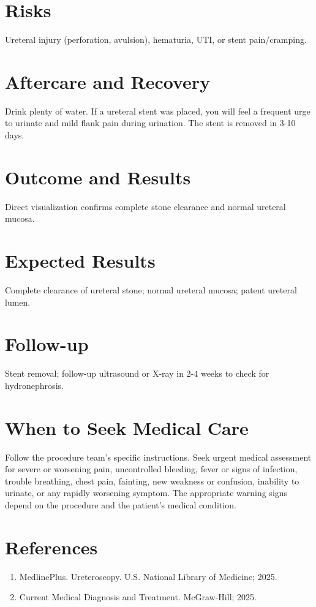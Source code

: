 \section*{Risks}
Ureteral injury (perforation, avulsion), hematuria, UTI, or stent pain/cramping.

\section*{Aftercare and Recovery}
Drink plenty of water. If a ureteral stent was placed, you will feel a frequent urge to urinate and mild flank pain during urination. The stent is removed in 3-10 days.

\section*{Outcome and Results}
Direct visualization confirms complete stone clearance and normal ureteral mucosa.

\section*{Expected Results}
Complete clearance of ureteral stone; normal ureteral mucosa; patent ureteral lumen.

\section*{Follow-up}
Stent removal; follow-up ultrasound or X-ray in 2-4 weeks to check for hydronephrosis.

\section*{When to Seek Medical Care}
Follow the procedure team's specific instructions. Seek urgent medical assessment for severe or worsening pain, uncontrolled bleeding, fever or signs of infection, trouble breathing, chest pain, fainting, new weakness or confusion, inability to urinate, or any rapidly worsening symptom. The appropriate warning signs depend on the procedure and the patient's medical condition.

\section*{References}
\begin{enumerate}
  \item MedlinePlus. Ureteroscopy. U.S. National Library of Medicine; 2025.
  \item Current Medical Diagnosis and Treatment. McGraw-Hill; 2025.
\end{enumerate}

\clearpage
